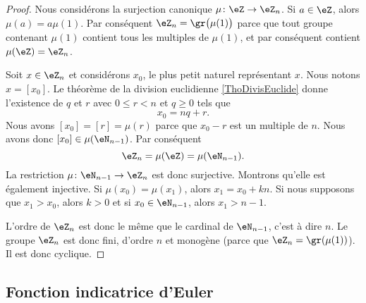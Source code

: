\begin{proof}
    Nous considérons la surjection canonique \( \mu\colon \eZ\to \eZ_n\). Si \( a\in\eZ\), alors \( \mu(a)=a\mu(1)\). Par conséquent \( \eZ_n=\gr\big( \mu(1) \big)\) parce que tout groupe contenant \( \mu(1)\) contient tous les multiples de \( \mu(1)\), et par conséquent contient \( \mu(\eZ)=\eZ_n\).

    Soit \( x\in\eZ_n\) et considérons \( x_0\), le plus petit naturel représentant \( x\). Nous notons \( x=[x_0]\). Le théorème de la division euclidienne \ref{ThoDivisEuclide} donne l'existence de \( q\) et \( r\) avec \( 0\leq r<n\) et \( q\geq 0\) tels que
    \begin{equation}
        x_0=nq+r.
    \end{equation}
    Nous avons \( [x_0]=[r]=\mu(r)\) parce que \( x_0-r\) est un multiple de \( n\). Nous avons donc \( [x_0]\in\mu(\eN_{n-1})\). Par conséquent
    \begin{equation}
        \eZ_n=\mu(\eZ)=\mu(\eN_{n-1}).
    \end{equation}
    La restriction \( \mu\colon \eN_{n-1}\to \eZ_n\) est donc surjective. Montrons qu'elle est également injective. Si \( \mu(x_0)=\mu(x_1)\), alors \( x_1=x_0+kn\). Si nous supposons que \( x_1>x_0\), alors \( k>0\) et si \( x_0\in\eN_{n-1}\), alors \( x_1>n-1\).

    L'ordre de \( \eZ_n\) est donc le même que le cardinal de \( \eN_{n-1}\), c'est à dire \( n\). Le groupe \( \eZ_n\) est donc fini, d'ordre \( n\) et monogène (parce que \( \eZ_n=\gr(\mu(1))\)). Il est donc cyclique.
\end{proof}
 
\subsection{Fonction indicatrice d'Euler}

